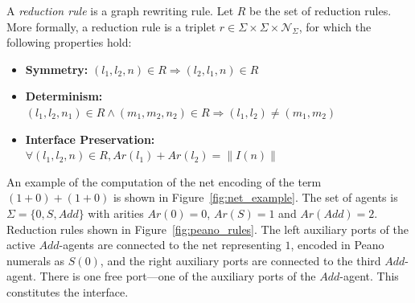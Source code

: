 \begin{definition}
A \textit{reduction rule} is a graph rewriting rule. Let $R$ be the set of reduction rules. More formally, a reduction rule is a triplet $r \in \Sigma \times \Sigma \times \mathcal{N}_\Sigma$, for which the following properties hold:
\begin{itemize}
    \item \textbf{Symmetry:} $(l_1, l_2, n) \in R \Rightarrow (l_2, l_1, n) \in R$
    \item \textbf{Determinism:} $(l_1, l_2, n_1) \in R \land (m_1, m_2, n_2) \in R \Rightarrow (l_1, l_2) \neq (m_1, m_2)$
    \item \textbf{Interface Preservation:} $\forall (l_1, l_2, n) \in R, Ar(l_1) + Ar(l_2) = \|I(n)\|$
\end{itemize}
\end{definition}

An example of the computation of the net encoding of the term $(1 + 0) + (1 + 0)$ is shown in Figure~\ref{fig:net_example}.
The set of agents is $\Sigma=\{0, S, Add\}$ with arities $Ar(0)=0$, $Ar(S)=1$ and $Ar(Add)=2$.
Reduction rules shown in Figure~\ref{fig:peano_rules}.
The left auxiliary ports of the active $Add$-agents are connected to the net representing $1$, encoded in Peano numerals as $S(0)$, and the right auxiliary ports are connected to the third $Add$-agent.
There is one free port---one of the auxiliary ports of the $Add$-agent.
This constitutes the interface.


